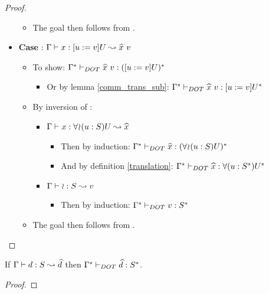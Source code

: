 \begin{proof}
\begin{itemize}
\begin{itemize}
\begin{itemize}
\begin{itemize}
                \end{itemize}
            \end{itemize}
            \item The goal then follows from .
        \end{itemize}
        \item \textbf{Case} :
            $\Gamma \vdash x: [u := v]U \leadsto \widehat{x}\ v$
        \begin{itemize}
            \item To show:
                $\TJT{\TRANS{\Gamma}}{\HAT{x}\ v}{\TRANS{(\SUB{u}{v}U)}}$
            \begin{itemize}
                \item Or by lemma \ref{comm_trans_sub}:
                    $\TJT{\TRANS{\Gamma}}{\HAT{x}\ v}{\SUB{u}{v}\TRANS{U}}$
            \end{itemize}
            \item By inversion of :
            \begin{itemize}
                \item $\Gamma \vdash x: \forall\!\wr\!(u:S)U \leadsto \widehat{x}$
                \begin{itemize}
                    \item Then by induction:
                        $\Gamma^{*} \vdash_{DOT} \widehat{x}: (\forall\!\wr\!(u:S)U)^{*}$
                    \item And by definition \ref{translation}:
                        $\Gamma^{*} \vdash_{DOT} \widehat{x}: \forall(u:S^{*})U^{*}$
                \end{itemize}
                \item $\Gamma \vdash \wr: S \leadsto v$
                \begin{itemize}
                    \item Then by induction:
                        $\Gamma^{*} \vdash_{DOT} v: S^{*}$
                \end{itemize}
            \end{itemize}
        \item The goal then follows from .
        \end{itemize}
    \end{itemize}
\end{proof}

\begin{THEOREM}
    \label{tp_defs}
    If $\Gamma \vdash d: S \leadsto \widehat{d}$ then
    $\Gamma^{*} \vdash_{DOT} \widehat{d}: S^{*}$.
\end{THEOREM}

\begin{proof}
    \TODOTHIS
\end{proof}
